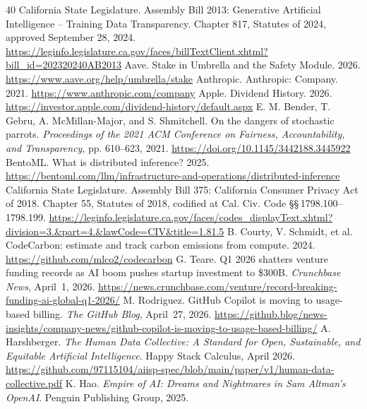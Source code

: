 \documentclass[10pt,a4paper,twocolumn]{article}
\renewcommand{\UrlFont}{\scriptsize\ttfamily}
\begin{document}
\newpage
{}
{}
{\small
\setlength{\bibsep}{2pt plus 0.3pt}
\renewcommand{\UrlFont}{\small\ttfamily}
\begin{thebibliography}{40}
 California State Legislature. Assembly Bill 2013: Generative Artificial Intelligence -- Training Data Transparency. Chapter 817, Statutes of 2024, approved September 28, 2024. \url{https://leginfo.legislature.ca.gov/faces/billTextClient.xhtml?bill_id=202320240AB2013}
 Aave. Stake in Umbrella and the Safety Module. 2026. \url{https://www.aave.org/help/umbrella/stake}
 Anthropic. Anthropic: Company. 2021. \url{https://www.anthropic.com/company}
 Apple. Dividend History. 2026. \url{https://investor.apple.com/dividend-history/default.aspx}
 E. M. Bender, T. Gebru, A. McMillan-Major, and S. Shmitchell. On the dangers of stochastic parrots. \emph{Proceedings of the 2021 ACM Conference on Fairness, Accountability, and Transparency}, pp. 610--623, 2021. \url{https://doi.org/10.1145/3442188.3445922}
 BentoML. What is distributed inference? 2025. \url{https://bentoml.com/llm/infrastructure-and-operations/distributed-inference}
 California State Legislature. Assembly Bill 375: California Consumer Privacy Act of 2018. Chapter 55, Statutes of 2018, codified at Cal. Civ. Code \S\S\,1798.100--1798.199. \url{https://leginfo.legislature.ca.gov/faces/codes_displayText.xhtml?division=3.&part=4.&lawCode=CIV&title=1.81.5}
 B. Courty, V. Schmidt, et al. CodeCarbon: estimate and track carbon emissions from compute. 2024. \url{https://github.com/mlco2/codecarbon}
 G. Teare. Q1 2026 shatters venture funding records as AI boom pushes startup investment to \$300B. \emph{Crunchbase News}, April~1, 2026. \url{https://news.crunchbase.com/venture/record-breaking-funding-ai-global-q1-2026/}
 M. Rodriguez. GitHub Copilot is moving to usage-based billing. \emph{The GitHub Blog}, April~27, 2026. \url{https://github.blog/news-insights/company-news/github-copilot-is-moving-to-usage-based-billing/}
 A. Harshberger. \emph{The Human Data Collective: A Standard for Open, Sustainable, and Equitable Artificial Intelligence}. Happy Stack Calculus, April 2026. \url{https://github.com/97115104/aiisp-spec/blob/main/paper/v1/human-data-collective.pdf}
 K. Hao. \emph{Empire of AI: Dreams and Nightmares in Sam Altman's OpenAI}. Penguin Publishing Group, 2025.

\end{thebibliography}}
\end{document}

